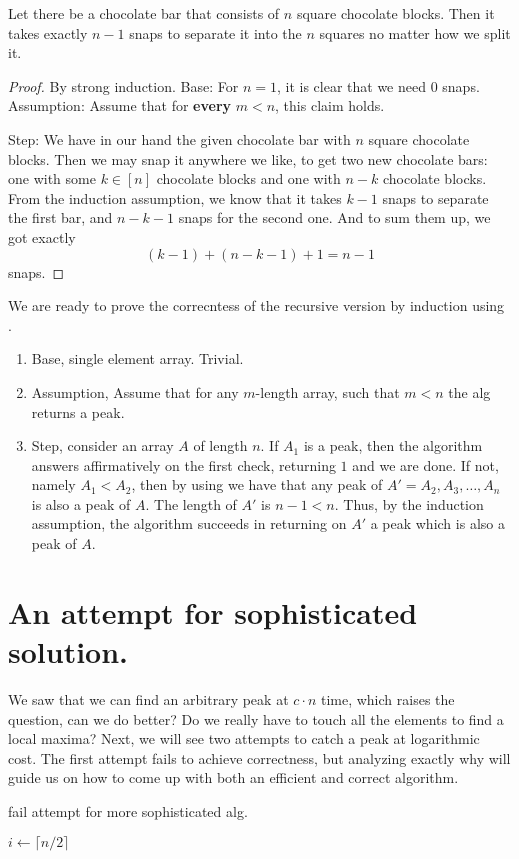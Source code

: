 \begin{example} 
  Let there be a chocolate bar that consists of \(n\) square chocolate blocks. Then it takes exactly \(n - 1\) snaps to separate it into the \(n\) squares no matter how we split it.

  \begin{proof} By strong induction. Base: For \(n = 1\), it is clear that we need \(0\) snaps. Assumption: Assume that for \textbf{every} \(m < n \), this claim holds.


Step: We have in our hand the given chocolate bar with \(n\) square chocolate blocks. Then we may snap it anywhere we like, to get two new chocolate bars: one with some \( k \in [n]\) chocolate blocks and one with \(n - k\) chocolate blocks. From the induction assumption, we know that it takes \(k - 1\) snaps to separate the first bar, and \(n - k - 1\) snaps for the second one. And to sum them up, we got exactly \[ (k - 1) + (n - k - 1) + 1 = n - 1 \] snaps.
\end{proof}
\end{example}

We are ready to prove the correcntess of the recursive version by induction using . 

\begin{enumerate}
  \item Base, single element array. Trivial. 
  \item Assumption, Assume that for any $m$-length array, such that $m<n$ the alg returns a peak. 
  \item Step, consider an array $A$ of length $n$. If $A_1$ is a peak, then the algorithm answers affirmatively on the first check, returning $1$ and we are done. If not, namely $A_1 < A_2$, then by using  we have that any peak of $A' = A_2, A_3, \dots, A_n$ is also a peak of $A$. The length of $A'$ is $n-1 < n$. Thus, by the induction assumption, the algorithm succeeds in returning on $A'$ a peak which is also a peak of $A$.
\end{enumerate}

\section{An attempt for sophisticated solution.}
We saw that we can find an arbitrary peak at $c\cdot n$ time, which raises the question, can we do better? Do we really have to touch all the elements to find a local maxima? Next, we will see two attempts to catch a peak at logarithmic cost. The first attempt fails to achieve correctness, but analyzing exactly why will guide us on how to come up with both an efficient and correct algorithm.
\begin{algorithm}
\caption{fail attempt for more sophisticated alg. }
        $ i \leftarrow  \lceil n/2 \rceil $\\
\end{algorithm}

